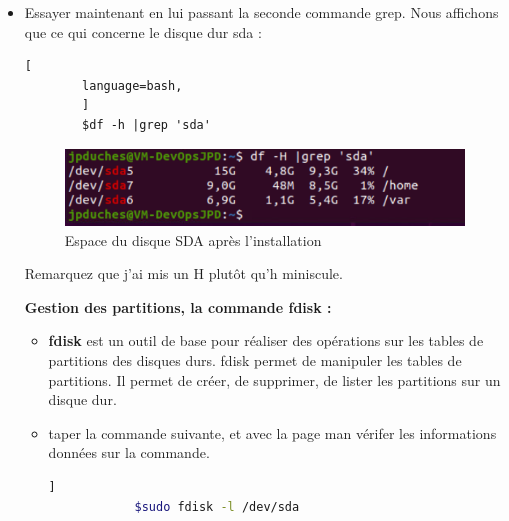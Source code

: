 \begin{itemize}
		
		\item Essayer maintenant en lui passant la seconde commande grep. Nous affichons que ce qui concerne le disque dur sda : 
		\begin{lstlisting}[
		language=bash,
		]
		$df -h |grep 'sda'
		\end{lstlisting}
		
		\begin{figure}[!htb]
			\centering
			\includegraphics[scale=0.8]{images/captureDFGREP}
			\caption{Espace du disque SDA après l'installation}
			\label{dfGREP}
		\end{figure}
		
		Remarquez que j'ai mis un {\color{blue}H} plutôt qu'{\color{blue}h} miniscule. 
		
		\vspace{10pt}
		
		\textbf{Gestion des partitions, la commande fdisk :}
		\begin{itemize}
			\item  \textbf{fdisk} est un outil de base pour réaliser des opérations sur les tables de partitions des disques durs.  
			fdisk permet de manipuler les tables de partitions. Il permet de créer, de supprimer, de lister les partitions sur un disque dur. 
			
			\item taper la commande suivante, et avec la page man vérifer les informations données sur la commande.
			\begin{lstlisting}[language=bash]   ]
			$sudo fdisk -l /dev/sda
			\end{lstlisting} 
		\end{itemize}
		

\end{itemize}
